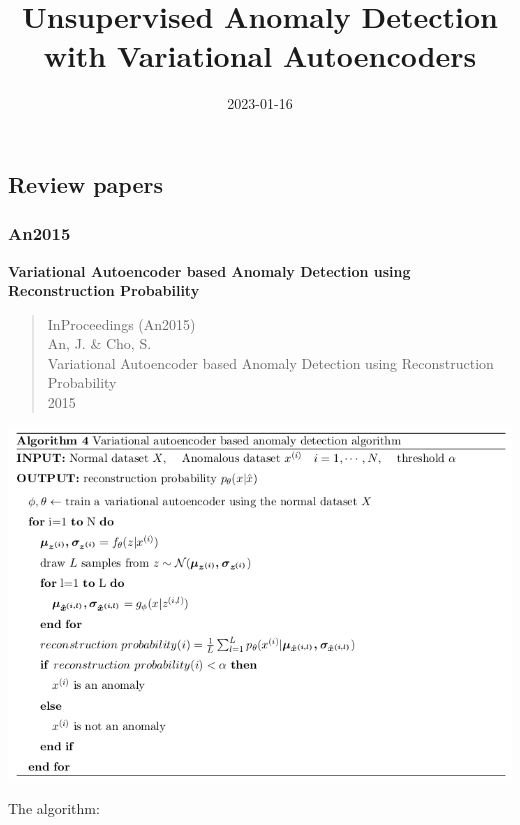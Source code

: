\documentclass[
  letterpaper,
  DIV=11,
  numbers=noendperiod]{scrartcl}
\title{Unsupervised Anomaly Detection with Variational Autoencoders}
\author{}
\date{2023-01-16}
\renewcommand*\contentsname{Table of contents}
\newcommand\contentsname{Table of contents}
\begin{document}
\maketitle

\renewcommand*\contentsname{Table of contents}
{
\hypersetup{linkcolor=}
\setcounter{tocdepth}{3}
\tableofcontents
}
\subsection{Review papers}\label{review-papers}

\subsubsection{An2015}\label{an2015}

\textbf{Variational Autoencoder based Anomaly Detection using
Reconstruction Probability}

\begin{quote}
InProceedings (An2015)\\
An, J. \& Cho, S.\\
Variational Autoencoder based Anomaly Detection using Reconstruction
Probability\\
2015
\end{quote}

\includegraphics{img/2023-01-16-17-17-52.png}

The algorithm:
\end{document}
